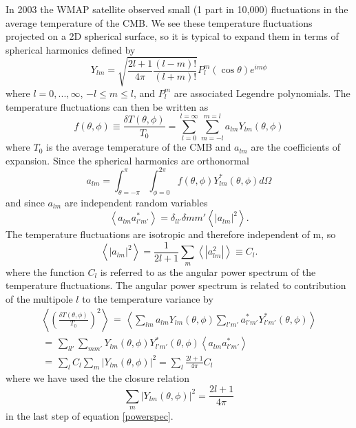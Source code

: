 \documentclass[a4paper,12pt]{article}
\def\mean#1{\left< #1 \right>}
\begin{document}
In 2003 the WMAP satellite observed small (1 part in 10,000) fluctuations in the average temperature of the CMB.  We see these temperature fluctuations projected on a 2D spherical surface, so it is typical to expand them in terms of spherical harmonics defined by
\begin{equation}\label{Ylm}
Y_{lm}=\sqrt{\frac{2l+1}{4\pi} \frac{(l-m)!}{(l+m)!}}P_l^m(\cos\theta)e^{im\phi}
\end{equation}
where $l=0,...,\infty$, $-l \le m \le l$, and $P_l^m$ are associated Legendre polynomials.  The temperature fluctuations can then be written as
\begin{equation}\label{dTdT0}
f(\theta,\phi) \equiv \frac{\delta T(\theta,\phi)}{T_0} = \sum_{l=0}^{l=\infty} \sum_{m=-l}^{m=l} a_{lm} Y_{lm}(\theta,\phi)
\end{equation}
where $T_0$ is the average temperature of the CMB and $a_{lm}$ are the coefficients of expansion. Since the spherical harmonics are orthonormal
\begin{equation}\label{alm}
a_{lm} = \int_{\theta=-\pi}^{\pi}\int_{\phi=0}^{2\pi} f(\theta,\phi)Y_{lm}^*(\theta,\phi) d\Omega
\end{equation}
and since $a_{lm}$ are independent random variables
\begin{equation}\label{alm_var1}
\mean{a_{lm}a_{l'm'}^*} = \delta_{ll'}\delta{mm'}\mean{|a_{lm}|^2}.
\end{equation}
The temperature fluctuations are isotropic and therefore independent of m, so
\begin{equation}\label{alm_var2}
\mean{|a_{lm}|^2}=\frac{1}{2l+1} \sum_{m}\mean{|a_{lm}^2|} \equiv C_l.
\end{equation}
where the function $C_l$ is referred to as the angular power spectrum of the temperature fluctuations.  The angular power spectrum is related to contribution of the multipole $l$ to the temperature variance by
\begin{align}\label{powerspec}
\mean{\left(\frac{\delta T(\theta,\phi)}{T_0} \right)^2} \begin{aligned} = \end{aligned} \mean{\sum_{lm}a_{lm}Y_{lm}(\theta,\phi)\sum_{l'm'}a_{l'm'}^*Y_{l'm'}^*(\theta,\phi)} \nonumber \\
\begin{aligned} = \end{aligned} \sum_{ll'}\sum_{mm'}Y_{lm}(\theta,\phi)Y_{l'm'}^*(\theta,\phi)\mean{a_{lm}a_{l'm'}^* } \\
\begin{aligned} = \end{aligned} \sum_l C_l \sum_m |Y_{lm}(\theta,\phi)|^2 = \sum_l \frac{2l+1}{4\pi}C_l  \nonumber
\end{align}
where we have used the the closure relation
\begin{equation}\label{closure}
\sum_m |Y_{lm}(\theta,\phi)|^2 = \frac{2l+1}{4\pi}
\end{equation}
in the last step of equation \ref{powerspec}. \cite{Kurki-Suonio}
\end{document}
